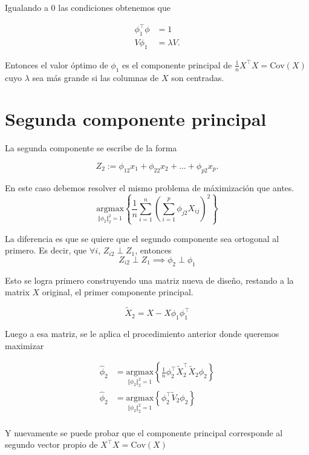 \documentclass[
  12pt,
]{book}
\theoremstyle{definition}
\theoremstyle{definition}
\theoremstyle{definition}
\theoremstyle{definition}
\theoremstyle{remark}
\begin{document}
Igualando a 0 las condiciones obtenemos que

\begin{align*}
\phi_1^\top \phi &= 1 \\
V \phi_1 &= \lambda V.
\end{align*}

Entonces el valor óptimo de \(\phi_1\) es el componente principal de \(\frac{1}{n}X^\top X = \mathrm{Cov}(X)\) cuyo \(\lambda\) sea más grande si las columnas de \(X\) son centradas.

\hypertarget{segunda-componente-principal}{%
\section{Segunda componente principal}\label{segunda-componente-principal}}

La segunda componente se escribe de la forma

\[ Z_{2}:= \phi_{12}x_1 + \phi_{22}x_2+\dots+\phi_{p2}x_p.\]

En este caso debemos resolver el mismo problema de máximización que antes.
\[\underset{\Vert\phi_2\Vert_2^2=1}{\mathrm{argmax}} \left\lbrace\dfrac{1}{n}\sum_{i=1}^{n}\left(\sum_{i=1}^p \phi_{j2} X_{ij} \right)^2 \right\rbrace\]

La diferencia es que se quiere que el segundo componente sea ortogonal al primero. Es decir, que \(\forall i\), \(Z_{i2}\perp Z_1\), entonces
\[ Z_{i2}\perp Z_1 \implies \phi_{2} \perp \phi_{1}\]

Esto se logra primero construyendo una matriz nueva de diseño, restando a la matrix \(X\) original, el primer componente principal.

\[
\tilde{X}_2 = X - X\phi_1\phi_1^\top
\]

Luego a esa matriz, se le aplica el procedimiento anterior donde queremos maximizar

\begin{align*}
\hat{\phi}_2 &= \underset{\Vert\phi_2\Vert_2^2=1}{\mathrm{argmax}} \left\{\frac{1}{n} \phi_2^\top \tilde{X}_2^\top \tilde{X}_2 \phi_2 \right\} \\
\hat{\phi}_2 &= \underset{\Vert\phi_2\Vert_2^2=1}{\mathrm{argmax}} \left\{\phi_2^\top \tilde{V}_2 \phi_2 \right\} \\
\end{align*}

Y nuevamente se puede probar que el componente principal corresponde al segundo vector propio de
\(X^\top X = \mathrm{Cov}(X)\)
\end{document}
